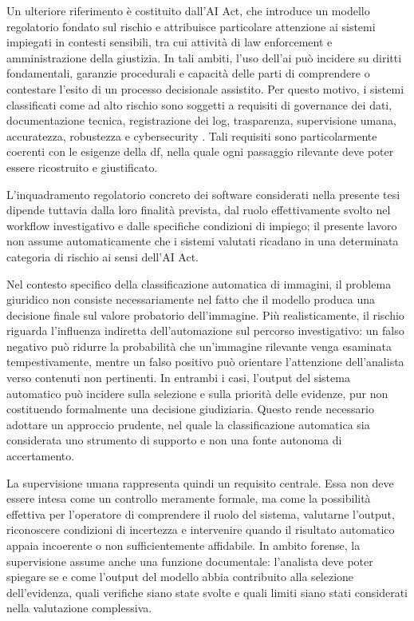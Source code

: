 Un ulteriore riferimento è costituito dall'AI Act, che introduce un modello regolatorio fondato sul rischio e attribuisce particolare attenzione ai sistemi impiegati in contesti sensibili, tra cui attività di law enforcement e amministrazione della giustizia. In tali ambiti, l'uso dell'\gls{ai} può incidere su diritti fondamentali, garanzie procedurali e capacità delle parti di comprendere o contestare l'esito di un processo decisionale assistito. Per questo motivo, i sistemi classificati come ad alto rischio sono soggetti a requisiti di governance dei dati, documentazione tecnica, registrazione dei log, trasparenza, supervisione umana, accuratezza, robustezza e cybersecurity \cite{aiact2024}. Tali requisiti sono particolarmente coerenti con le esigenze della \gls{df}, nella quale ogni passaggio rilevante deve poter essere ricostruito e giustificato.

L'inquadramento regolatorio concreto dei software considerati nella presente tesi dipende tuttavia dalla loro finalità prevista, dal ruolo effettivamente svolto nel workflow investigativo e dalle specifiche condizioni di impiego; il presente lavoro non assume automaticamente che i sistemi valutati ricadano in una determinata categoria di rischio ai sensi dell'AI Act.

Nel contesto specifico della classificazione automatica di immagini, il problema giuridico non consiste necessariamente nel fatto che il modello produca una decisione finale sul valore probatorio dell'immagine. Più realisticamente, il rischio riguarda l'influenza indiretta dell'automazione sul percorso investigativo: un falso negativo può ridurre la probabilità che un'immagine rilevante venga esaminata tempestivamente, mentre un falso positivo può orientare l'attenzione dell'analista verso contenuti non pertinenti. In entrambi i casi, l'output del sistema automatico può incidere sulla selezione e sulla priorità delle evidenze, pur non costituendo formalmente una decisione giudiziaria. Questo rende necessario adottare un approccio prudente, nel quale la classificazione automatica sia considerata uno strumento di supporto e non una fonte autonoma di accertamento.

La supervisione umana rappresenta quindi un requisito centrale. Essa non deve essere intesa come un controllo meramente formale, ma come la possibilità effettiva per l'operatore di comprendere il ruolo del sistema, valutarne l'output, riconoscere condizioni di incertezza e intervenire quando il risultato automatico appaia incoerente o non sufficientemente affidabile. In ambito forense, la supervisione assume anche una funzione documentale: l'analista deve poter spiegare se e come l'output del modello abbia contribuito alla selezione dell'evidenza, quali verifiche siano state svolte e quali limiti siano stati considerati nella valutazione complessiva.


